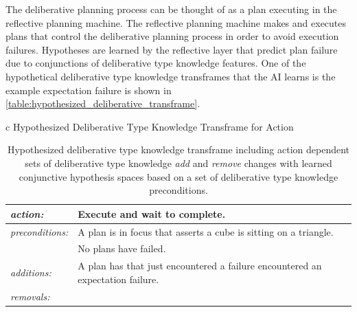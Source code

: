 The deliberative planning process can be thought of as a plan
executing in the reflective planning machine.  The reflective planning
machine makes and executes plans that control the deliberative
planning process in order to avoid execution failures.  Hypotheses are
learned by the reflective layer that predict plan failure due to
conjunctions of deliberative type knowledge features.  One of the
hypothetical deliberative type knowledge transframes that the AI
learns is the example expectation failure is shown in
{\mbox{\autoref{table:hypothesized_deliberative_transframe}}}.
\begin{table}[h]
\centering
\begin{tabular}{c}
  Hypothesized Deliberative Type Knowledge Transframe for Action \\
  \begin{tabular}{|l|p{8cm}|}
    \hline
    \emph{action:}        & Execute and wait to complete. \\
    \hline
    \emph{preconditions:} & A plan is in focus that asserts a cube is sitting on a triangle. \\
    ~                     & No plans have failed. \\
    \hline
    \emph{additions:}     & A plan has that just encountered a failure encountered an expectation failure. \\
    \hline
    \emph{removals:}      & \\
    \hline
  \end{tabular}
\end{tabular}
\caption[Hypothesized deliberative type knowledge transframe for
  action.]{Hypothesized deliberative type knowledge transframe
  including action dependent sets of deliberative type knowledge
  \emph{add} and \emph{remove} changes with learned conjunctive
  hypothesis spaces based on a set of deliberative type knowledge
  preconditions.}
\label{table:hypothesized_deliberative_transframe}
\end{table}

